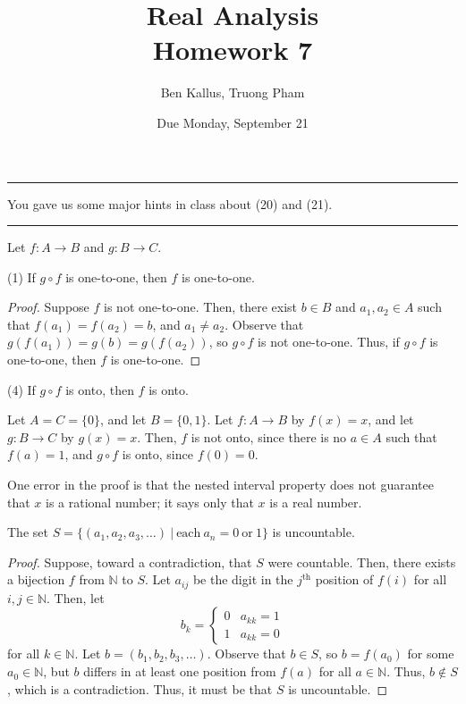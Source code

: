 \documentclass[12pt]{article}
\title{Real Analysis \\ Homework 7}
\author{Ben Kallus, Truong Pham}
\date{Due Monday, September 21}
\begin{document}
\maketitle

\hrule
\bigskip

 You gave us some major hints in class about (20) and (21).

\bigskip
\hrule
\bigskip

 Let $f: A \to B$ and $g: B \to C$.

 (1) If $g \circ f$ is one-to-one, then $f$ is one-to-one.
\begin{proof}
    Suppose $f$ is not one-to-one. Then, there exist $b \in B$ and $a_1,a_2 \in A$ such that $f(a_1) = f(a_2) = b$, and $a_1 \neq a_2$. Observe that $g(f(a_1)) = g(b) = g(f(a_2))$, so $g \circ f$ is not one-to-one. Thus, if $g \circ f$ is one-to-one, then $f$ is one-to-one.
\end{proof}

\medskip
{} (4) If $g \circ f$ is onto, then $f$ is onto.

 Let $A = C = \{0\}$, and let $B = \{0,1\}$. Let $f: A \to B$ by $f(x) = x$, and let $g: B \to C$ by $g(x) = x$. Then, $f$ is not onto, since there is no $a \in A$ such that $f(a) = 1$, and $g \circ f$ is onto, since $f(0) = 0$.

\newpage
{}

    One error in the proof is that the nested interval property does not guarantee that $x$ is a rational number; it says only that $x$ is a real number.

\newpage
{} The set $S = \{(a_1, a_2, a_3, \hdots)~|~\text{each}~a_n = 0~\text{or}~1\}$ is uncountable.

\begin{proof}
    Suppose, toward a contradiction, that $S$ were countable. Then, there exists a bijection $f$ from $\mathbb N$ to $S$. Let $a_{ij}$ be the digit in the $j^\text{th}$ position of $f(i)$ for all $i,j \in \mathbb N$. Then, let $$b_k =
    \begin{cases}
        0 & a_{kk} = 1 \\
        1 & a_{kk} = 0
    \end{cases}$$ for all $k \in \mathbb N$. Let $b = (b_1, b_2, b_3, \hdots)$. Observe that $b \in S$, so $b = f(a_0)$ for some $a_0 \in \mathbb N$, but $b$ differs in at least one position from $f(a)$ for all $a \in \mathbb N$. Thus, $b \notin S$, which is a contradiction. Thus, it must be that $S$ is uncountable.
\end{proof}
\end{document}

